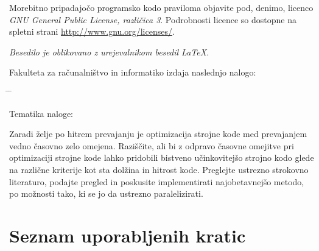 \documentclass[a4paper, 12pt]{book}
\newcommand{\clearemptydoublepage}{\newpage{\pagestyle{empty}\cleardoublepage}}
\begin{document}
Morebitno pripadajočo programsko kodo praviloma objavite pod, denimo, licenco 
\emph{GNU General Public License, različica 3}. Podrobnosti licence so dostopne na spletni strani \href{http://www.gnu.org/licenses/}{http://www.gnu.org/licenses/}.

\begin{center}
\mbox{}\vfill
\emph{Besedilo je oblikovano z urejevalnikom besedil \LaTeX.}
\end{center}
\clearemptydoublepage

\thispagestyle{empty}
\vspace*{4cm}

\noindent
Fakulteta za računalništvo in informatiko izdaja naslednjo nalogo:
\medskip
\begin{tabbing}
\hspace{32mm}\= \hspace{6cm} \= \kill




Tematika naloge:
\end{tabbing}
Zaradi želje po hitrem prevajanju je optimizacija strojne kode med prevajanjem vedno časovno zelo omejena. Raziščite, ali bi z odpravo časovne omejitve pri optimizaciji strojne kode lahko pridobili bistveno učinkovitejšo strojno kodo glede na različne kriterije kot sta dolžina in hitrost kode. Preglejte ustrezno strokovno literaturo, podajte pregled in poskusite implementirati najobetavnejšo metodo, po možnosti tako, ki se jo da ustrezno paralelizirati.
\vspace{15mm}






\vspace{2cm}

\clearemptydoublepage

\pagestyle{empty}
\def\thepage{}%
\tableofcontents{}


\clearemptydoublepage


\chapter*{Seznam uporabljenih kratic}  %
\end{document}
